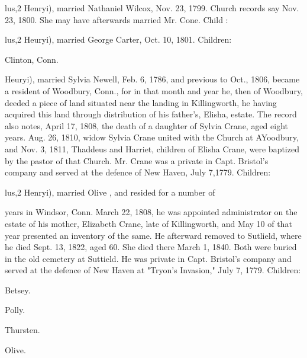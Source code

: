 \documentclass[oneside]{book}
\begin{document}
lus,2 Henryi), married Nathaniel Wilcox, Nov. 23, 1799. Church 
records say Nov. 23, 1800. She may have afterwards married 
Mr. Cone. Child : 





lus,2 Heuryi), married George Carter, Oct. 10, 1801. Children: 






Clinton, Conn. 





Heuryi), married Sylvia Newell, Feb. 6, 1786, and previous to 
Oct., 1806, became a resident of Woodbury, Conn., for in that 
month and year he, then of Woodbury, deeded a piece of land 
situated near the landing in Killingworth, he having acquired 
this land through distribution of his father's, Elisha, estate. The 
record also notes, April 17, 1808, the death of a daughter of 
Sylvia Crane, aged eight years. Aug. 26, 1810, widow Sylvia 
Crane united with the Church at AYoodbury, and Nov. 3, 1811, 
Thaddeus and Harriet, children of Elisha Crane, were baptized 
by the pastor of that Church. Mr. Crane was a private in Capt. 
Bristol's company and served at the defence of New Haven, July 
7,1779. Children: 









lus,2 Henryi), married Olive , and resided for a number of 

years in Windsor, Conn. March 22, 1808, he was appointed 
administrator on the estate of his mother, Elizabeth Crane, late 
of Killingworth, and May 10 of that year presented an inventory 
of the same. He afterward removed to Sutlield, where he died 
Sept. 13, 1822, aged 60. She died there March 1, 1840. Both 
were buried in the old cemetery at Suttield. He was private in 
Capt. Bristol's company and served at the defence of New Haven 
at "Tryon's Invasion," July 7, 1779. Children: 





Betsey. 




Polly. 




Thursten. 




Olive. 
\end{document}
